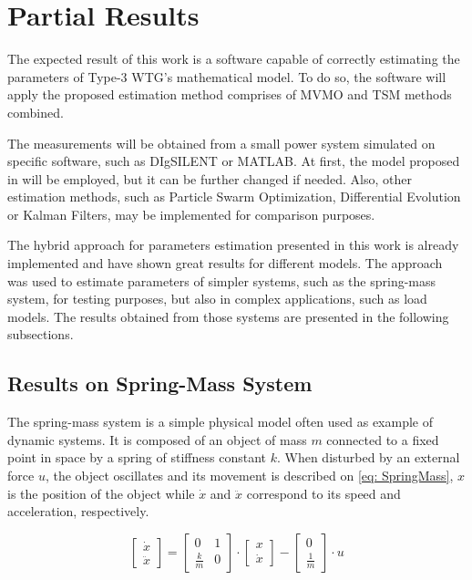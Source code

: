 \chapter{Partial Results}

\label{ch: Res}

The expected result of this work is a software capable of correctly estimating the parameters of Type-3 WTG's mathematical model. To do so, the software will apply the proposed estimation method comprises of MVMO and TSM methods combined. 

The measurements will be obtained from a small power system simulated on specific software, such as DIgSILENT or MATLAB. At first, the model proposed in \cite{Erlich2012} will be employed, but it can be further changed if needed. Also, other estimation methods, such as Particle Swarm Optimization, Differential Evolution or Kalman Filters, may be implemented for comparison purposes.

The hybrid approach for parameters estimation presented in this work is already implemented and have shown great results for different models. The approach was used to estimate parameters of simpler systems, such as the spring-mass system, for testing purposes, but also in complex applications, such as load models. The results obtained from those systems are presented in the following subsections.

\section{Results on Spring-Mass System}

The spring-mass system is a simple physical model often used as example of dynamic systems. It is composed of an object of mass $m$ connected to a fixed point in space by a spring of stiffness constant $k$. When disturbed by an external force $u$, the object oscillates and its movement is described on \eqref{eq: SpringMass}, $x$ is the position of the object while $\dot{x}$ and $\ddot{x}$ correspond to its speed and acceleration, respectively.

\begin{equation}
	\begin{bmatrix}
		\dot{x} \\
		\ddot{x}
	\end{bmatrix} = 
	\begin{bmatrix}
		0 & 1 \\
		\frac{k}{m} & 0
	\end{bmatrix}\cdot
	\begin{bmatrix}
		x \\
		\dot{x}
	\end{bmatrix} -
	\begin{bmatrix}
		0 \\
		\frac{1}{m}
	\end{bmatrix}
	\cdot
	u
	\label{eq: SpringMass}
\end{equation}


